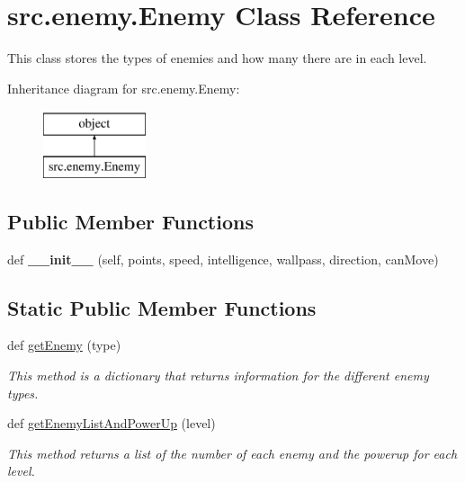 \hypertarget{classsrc_1_1enemy_1_1_enemy}{}\section{src.\+enemy.\+Enemy Class Reference}
\label{classsrc_1_1enemy_1_1_enemy}


This class stores the types of enemies and how many there are in each level.  


Inheritance diagram for src.\+enemy.\+Enemy\+:\begin{figure}[H]
\begin{center}
\leavevmode
\includegraphics[height=2.000000cm]{classsrc_1_1enemy_1_1_enemy}
\end{center}
\end{figure}
\subsection*{Public Member Functions}
\begin{DoxyCompactItemize}
\item 
\hypertarget{classsrc_1_1enemy_1_1_enemy_a6ec62571df1087a1a7683d62a4434081}{}def {\bfseries \+\_\+\+\_\+init\+\_\+\+\_\+} (self, points, speed, intelligence, wallpass, direction, can\+Move)\label{classsrc_1_1enemy_1_1_enemy_a6ec62571df1087a1a7683d62a4434081}

\end{DoxyCompactItemize}
\subsection*{Static Public Member Functions}
\begin{DoxyCompactItemize}
\item 
def \hyperlink{classsrc_1_1enemy_1_1_enemy_a4476f5bc0be70d26bebece6abcb7bdad}{get\+Enemy} (type)
\begin{DoxyCompactList}\small\item\em This method is a dictionary that returns information for the different enemy types. \end{DoxyCompactList}\item 
def \hyperlink{classsrc_1_1enemy_1_1_enemy_a01da6a5d5f8eb5db75323749a80fc3a0}{get\+Enemy\+List\+And\+Power\+Up} (level)
\begin{DoxyCompactList}\small\item\em This method returns a list of the number of each enemy and the powerup for each level. \end{DoxyCompactList}\end{DoxyCompactItemize}
